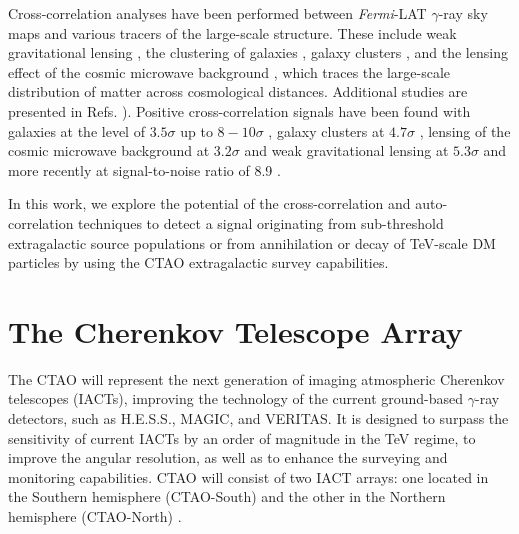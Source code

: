 \documentclass[aps,prd,a4paper,reprint,nofootinbib,superscriptaddress,floatfix,preprintnumbers]{revtex4-2}
\begin{document}
Cross-correlation analyses have been performed between \textit{Fermi}-LAT $\gamma$-ray sky maps and various tracers of the large-scale structure. These include weak gravitational lensing  \cite{shirasaki2014cross,shirasaki2016cosmological,troster2017cross,DES:2019ucp}, the clustering of galaxies \cite{xia2015tomography,regis2015particle,cuoco2015dark,shirasaki2015cross,cuoco2017tomographic,Ammazzalorso:2018evf,paopiamsap2024constraints}, galaxy clusters \cite{branchini2017cross,shirasaki2018correlation,hashimoto2019measurement,colavincenzo2020searching,tan2020bounds}, and the lensing effect of the cosmic microwave background \cite{fornengo2015evidence}, which traces %
the large-scale distribution of matter across cosmological distances. Additional studies are presented in Refs. \cite{ando2014mapping,Fornengo:2013rga,fornasa2016angular,feng2017planck,Tan:2020fbc}). 
%
Positive cross-correlation signals have been found with galaxies at the level of $3.5\sigma$ \cite{xia2015tomography,regis2015particle,cuoco2015dark} up to $8-10\sigma$ \cite{paopiamsap2024constraints}, galaxy clusters at $4.7\sigma$ \cite{branchini2017cross}, lensing of the cosmic microwave background at $3.2\sigma$ \cite{fornengo2015evidence} and weak gravitational lensing at $5.3\sigma$ \cite{DES:2019ucp} and more recently at signal-to-noise ratio of 8.9  \cite{DES:2025ulp}.

In this work, we explore the potential of the cross-correlation and auto-correlation techniques to detect a signal originating from sub-threshold extragalactic source populations or from annihilation or decay of TeV-scale DM particles by using the CTAO extragalactic survey capabilities.





\section{The Cherenkov Telescope Array}\label{sec:CTA}
The CTAO will represent the next generation of imaging atmospheric Cherenkov telescopes (IACTs), improving the technology of the current ground-based $\gamma$-ray detectors, such as H.E.S.S., MAGIC, and VERITAS. It is designed to surpass the sensitivity of current IACTs by an order of magnitude in the TeV regime, to improve the angular resolution, as well as to enhance the surveying and monitoring capabilities. CTAO  will consist of two IACT arrays: one located in the Southern hemisphere (CTAO-South) and the other in the Northern hemisphere (CTAO-North) \cite{CTAConsortium:2017dvg}.
\end{document}
